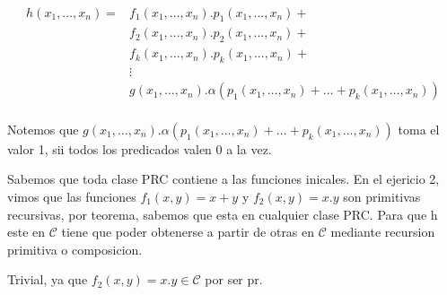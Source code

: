 \documentclass{report}
\begin{document}
\sol \\
$$\begin{aligned}
		h(x_1,...,x_n) = & f_{1}(x_{1},...,x_{n}).p_{1}(x_{1},...,x_{n})+                           \\
		                 & f_2(x_1,...,x_n).p_2(x_1,...,x_n)+                                       \\
		                 & f_k(x_1,...,x_n).p_k(x_1,...,x_n)+                                       \\
		                 & \vdots                                                                   \\
		                 & g(x_1,\ldots,x_n).\alpha(p_1(x_1,\ldots,x_n)+\ldots+p_k(x_1,\ldots,x_n))
	\end{aligned}$$
\\
Notemos que $g(x_1,\ldots,x_n).\alpha(p_1(x_1,\ldots,x_n)+\ldots+p_k(x_1,\ldots,x_n))$ toma el valor 1, sii todos los predicados valen 0 a la vez.

Sabemos que toda clase PRC contiene a las funciones inicales. En el ejericio 2, vimos que las funciones $f_1(x,y) = x+y$ y $f_2(x,y) = x.y$ son primitivas recursivas, por teorema, sabemos que esta en cualquier clase PRC.
Para que h este en $\mathcal{C}$ tiene que poder obtenerse a partir de otras en $\mathcal{C}$ mediante recursion primitiva o composicion.


\begin{myproof}
	Trivial, ya que $f_2(x,y) = x.y \in \mathcal{C}$ por ser pr.
\end{myproof}
\end{document}
